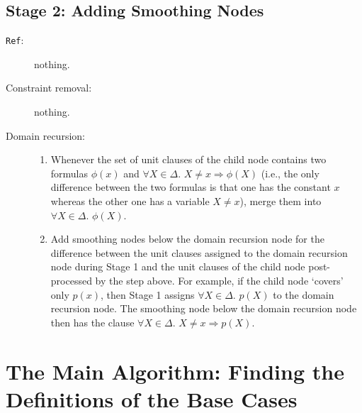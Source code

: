 \documentclass{article}
\begin{document}
\subsection{Stage 2: Adding Smoothing Nodes}


\begin{description}
  \item[\texttt{Ref}:] nothing.
  \item[Constraint removal:] nothing.
  \item[Domain recursion:]
        \begin{enumerate}
          \item Whenever the set of unit clauses of the child node contains two
                formulas $\phi(x)$ and $\forall X \in \Delta\text{.
                } X \ne x \Rightarrow \phi(X)$ (i.e., the only difference
                between the two formulas is that one has the constant $x$
                whereas the other one has a variable $X \ne x$), merge them into
                $\forall X \in \Delta\text{. }\phi(X)$.
          \item Add smoothing nodes below the domain recursion node for the
                difference between the unit clauses assigned to the domain
                recursion node during Stage 1 and the unit clauses of the child
                node post-processed by the step above. For example, if the child
                node `covers' only $p(x)$, then Stage 1 assigns
                $\forall X \in \Delta\text{. }p(X)$ to the domain recursion
                node. The smoothing node below the domain recursion node then
                has the clause $\forall X \in \Delta\text{.
                } X \ne x \Rightarrow p(X)$.
        \end{enumerate}
\end{description}


\section{The Main Algorithm: Finding the Definitions of the Base
  Cases}\label{sec:main}
\end{document}
